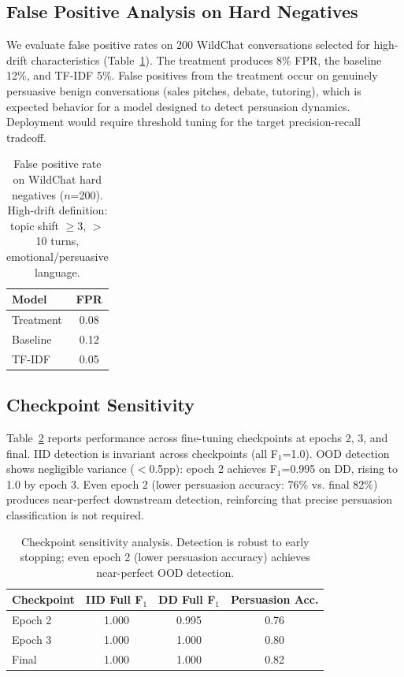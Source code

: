 \documentclass[11pt,a4paper]{article}
\newcommand{\fone}{F$_1$}
\begin{document}
\subsection{False Positive Analysis on Hard Negatives}

We evaluate false positive rates on 200 WildChat conversations selected for high-drift characteristics (Table~\ref{tab:fpr}).
The treatment produces 8\% FPR, the baseline 12\%, and TF-IDF 5\%.
False positives from the treatment occur on genuinely persuasive benign conversations (sales pitches, debate, tutoring), which is expected behavior for a model designed to detect persuasion dynamics.
Deployment would require threshold tuning for the target precision-recall tradeoff.

\begin{table}[t]
\centering
\caption{False positive rate on WildChat hard negatives ($n$=200). High-drift definition: topic shift $\geq$3, $>$10 turns, emotional/persuasive language.}
\label{tab:fpr}
\begin{tabular}{lc}
\toprule
Model & FPR \\
\midrule
Treatment & 0.08 \\
Baseline  & 0.12 \\
TF-IDF    & 0.05 \\
\bottomrule
\end{tabular}
\end{table}

\subsection{Checkpoint Sensitivity}

Table~\ref{tab:checkpoint} reports performance across fine-tuning checkpoints at epochs 2, 3, and final.
IID detection is invariant across checkpoints (all \fone{}=1.0).
OOD detection shows negligible variance ($<$0.5pp): epoch 2 achieves \fone{}=0.995 on DD, rising to 1.0 by epoch 3.
Even epoch 2 (lower persuasion accuracy: 76\% vs. final 82\%) produces near-perfect downstream detection, reinforcing that precise persuasion classification is not required.

\begin{table}[t]
\centering
\caption{Checkpoint sensitivity analysis. Detection is robust to early stopping; even epoch 2 (lower persuasion accuracy) achieves near-perfect OOD detection.}
\label{tab:checkpoint}
\begin{tabular}{lccc}
\toprule
Checkpoint & IID Full \fone{} & DD Full \fone{} & Persuasion Acc. \\
\midrule
Epoch 2 & 1.000 & 0.995 & 0.76 \\
Epoch 3 & 1.000 & 1.000 & 0.80 \\
Final   & 1.000 & 1.000 & 0.82 \\
\bottomrule
\end{tabular}
\end{table}
\end{document}
